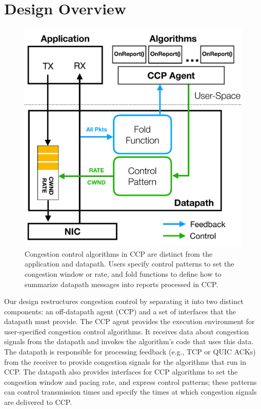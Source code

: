 \section{Design Overview}
\label{s:design}
%
\begin{figure}[t]
\centering
    \includegraphics[width=\columnwidth]{img/ccp_design_sigcomm}
    \caption{Congestion control algorithms in CCP are distinct from the application and datapath.
    Users specify control patterns to set the congestion window or rate,
    and fold functions to define how to summarize datapath messages into reports processed in CCP.}\label{fig:design}
\end{figure}
%
Our design restructures congestion control by separating it into two distinct components: an off-datapath agent (CCP) and a set of interfaces that the datapath must provide. The CCP agent provides the execution environment for user-specified congestion control algorithms. It receives data about congestion signals from the datapath and invokes the algorithm's code that uses this data. The datapath is responsible for processing feedback (e.g., TCP or QUIC ACKs) from the receiver to provide congestion signals for the algorithms that run in CCP. The datapath also provides interfaces for CCP algorithms to set the congestion window and pacing rate, and express control patterns; these patterns can control transmission times and specify the times at which congestion signals are delivered to CCP.


